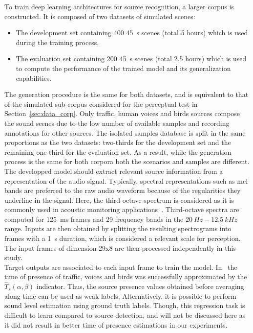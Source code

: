 \documentclass[11pt,a4paper]{article}
\begin{document}
To train deep learning architectures for source recognition, a larger corpus is constructed. It is composed of two datasets of simulated scenes:
\begin{itemize}
\item The development set containing 400 45~s scenes (total 5 hours) which is used during the training process,
\item The evaluation set containing 200 45~s scenes (total 2.5 hours) which is used to compute the performance of the trained model and its generalization capabilities.
\end{itemize}

The generation procedure is the same for both datasets, and is equivalent to that of the simulated sub-corpus considered for the perceptual test in Section~\ref{sec:data_corp}. Only traffic, human voices and birds sources compose the sound scenes due to the low number of available samples and recording annotations for other sources. The isolated samples database is split in the same proportions as the two datasets: two-thirds for the development set and the remaining one-third for the evaluation set. As a result, while the generation process is the same for both corpora both the scenarios and samples are different.\\

The developped model should extract relevant source information from a representation of the audio signal. Typically, spectral representations such as mel bands are preferred to the raw audio waveform because of the regularities they underline in the signal. Here, the third-octave spectrum is considered as it is commonly used in acoustic monitoring applications~\cite{ardouin2018, gontier2017}. Third-octave spectra are computed for 125~ms frames and 29 frequency bands in the $20~Hz - 12.5~kHz$ range. Inputs are then obtained by splitting the resulting spectrograms into frames with a 1~s duration, which is considered a relevant scale for perception. The input frames of dimension 29x8 are then processed independently in this study.\\

Target outputs are associated to each input frame to train the model. In~\cite{gontier2018} the time of presence of traffic, voices and birds was successfully approximated by the $\hat T_s(\alpha, \beta)$ indicator. Thus, the source presence values obtained before averaging along time can be used as weak labels. Alternatively, it is possible to perform sound level estimation using ground truth labels. Though, this regression task is difficult to learn compared to source detection, and will not be discussed here as it did not result in better time of presence estimations in our experiments.\\
\end{document}
